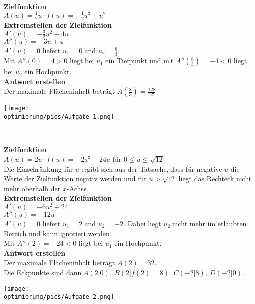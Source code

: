\begin{Answer}[ref=optimierungA1]\\
	\begin{minipage}{\textwidth}
		\begin{minipage}{.5\textwidth}\raggedright
			\textbf{Zielfunktion}\\
			\(A(u)=\frac{1}{2}u\cdot f(u)=-\frac{1}{2}u^3+u^2\)\\
			\textbf{Extremstellen der Zielfunktion}\\
			\(A'(u)=-\frac{3}{2}u^2+4u\)\\
			\(A''(u)=-3u+4\)\\
			\(A'(u)=0\) liefert \(u_1=0\) und \(u_2=\frac{8}{3}\)\\
			Mit \(A''(0)=4>0\) liegt bei \(u_1\) ein Tiefpunkt und mit \(A''\left(\frac{8}{3}\right)=-4<0\) liegt bei \(u_2\) ein Hochpunkt.\\
			\textbf{Antwort erstellen}\\
			Der maximale Flächeninhalt beträgt \(A\left(\frac{8}{3}\right)=\frac{128}{27}\)
		\end{minipage}
		\begin{minipage}{.5\textwidth}
			\texttt{[image: \\optimierung/pics/Aufgabe\_1.png]}
		\end{minipage}
	\end{minipage}
\end{Answer}
\begin{Answer}[ref=optimierungA2]\\
	\begin{minipage}{\textwidth}
		\begin{minipage}{.5\textwidth}\raggedright
			\textbf{Zielfunktion}\\
			\(A(u)=2u\cdot f(u)=-2u^3+24u\) für \(0\leq u\leq \sqrt{12}\)\\
			Die Einschränkung für \(u\) ergibt sich aus der Tatsache, dass für negative \(u\) die Werte der Zielfunktion negativ werden und für \(u>\sqrt{12}\) liegt das Rechteck nicht mehr oberhalb der \(x\)-Achse.\\
			\textbf{Extremstellen der Zielfunktion}\\
			\(A'(u)=-6u^2+24\)\\
			\(A''(u)=-12u\)\\
			\(A'(u)=0\) liefert \(u_1=2\) und \(u_2=-2\). Dabei liegt \(u_2\) nicht mehr im erlaubten Bereich und kann ignoriert werden.\\
			Mit \(A''(2)=-24<0\) liegt bei \(u_1\) ein Hochpunkt.\\
			\textbf{Antwort erstellen}\\
			Der maximale Flächeninhalt beträgt \(A\left(2\right)=32\).\\
			Die Eckpunkte sind dann \(A(2\vert 0),\ B(2\vert f(2)=8),\ C(-2\vert 8),\ D(-2\vert 0)\).
		\end{minipage}
		\begin{minipage}{.5\textwidth}
			\texttt{[image: \\optimierung/pics/Aufgabe\_2.png]}
		\end{minipage}
	\end{minipage}
\end{Answer}
